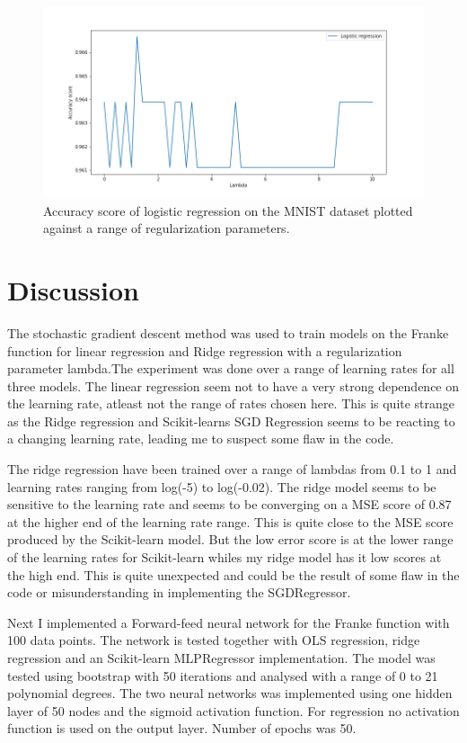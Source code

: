 \documentclass[reprint,english,notitlepage]{revtex4-2}  %
\begin{document}
\begin{figure}
	\includegraphics[scale=0.3]{Parte-1}
	\caption{Accuracy score of logistic regression on the MNIST dataset plotted against a range of regularization parameters.}
\end{figure}

\section{Discussion}

The stochastic gradient descent method was used to train models on the Franke function for linear regression and Ridge regression with a regularization parameter lambda.The experiment was done over a range of learning rates for all three models.  The linear regression seem not to have a very strong dependence on the learning rate, atleast not the range of rates chosen here. This is quite strange as the Ridge regression and Scikit-learns SGD Regression seems to be reacting to a changing learning rate, leading me to suspect some flaw in the code. 

The ridge regression have been trained over a range of lambdas from 0.1 to 1 and learning rates ranging from log(-5) to log(-0.02). The ridge model seems to be sensitive to the learning rate and seems to be converging on a MSE score of 0.87 at the higher end of the learning rate range. This is quite close to the MSE score produced by the Scikit-learn model. But the low error score is at the lower range of the learning rates for Scikit-learn whiles my ridge model has it low scores at the high end. This is quite unexpected and could be the result of some flaw in the code or misunderstanding in implementing the SGDRegressor. 

Next I implemented a Forward-feed neural network for the Franke function with 100 data points. The network is tested together with OLS regression, ridge regression and an Scikit-learn MLPRegressor implementation. The model was tested using bootstrap with 50 iterations and analysed with a range of 0 to 21 polynomial degrees. The two neural networks was implemented using one hidden layer of 50 nodes and the sigmoid activation function. For regression no activation function is used on the output layer. Number of epochs was 50. 
\end{document}
